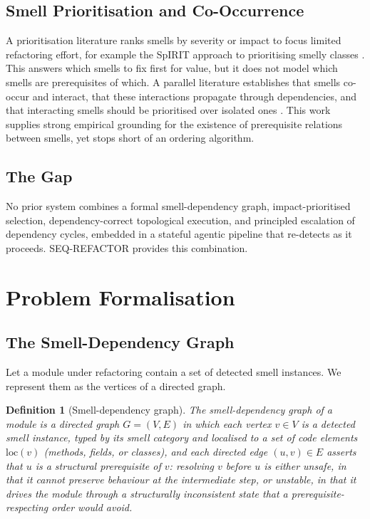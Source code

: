 \documentclass[journal,onecolumn,11pt]{IEEEtran}
\newtheorem{definition}{Definition}
\begin{document}
\subsection{Smell Prioritisation and Co-Occurrence}
A prioritisation literature ranks smells by severity or impact to focus limited refactoring effort, for example the SpIRIT approach to prioritising smelly classes \cite{vidal2016}. This answers which smells to fix first for value, but it does not model which smells are prerequisites of which. A parallel literature establishes that smells co-occur and interact, that these interactions propagate through dependencies, and that interacting smells should be prioritised over isolated ones \cite{yamashita2013,palomba2015}. This work supplies strong empirical grounding for the existence of prerequisite relations between smells, yet stops short of an ordering algorithm.

\subsection{The Gap}
No prior system combines a formal smell-dependency graph, impact-prioritised selection, dependency-correct topological execution, and principled escalation of dependency cycles, embedded in a stateful agentic pipeline that re-detects as it proceeds. SEQ-REFACTOR provides this combination.

\section{Problem Formalisation}
\label{sec:formal}
\subsection{The Smell-Dependency Graph}
Let a module under refactoring contain a set of detected smell instances. We represent them as the vertices of a directed graph.

\begin{definition}[Smell-dependency graph]
The smell-dependency graph of a module is a directed graph $G=(V,E)$ in which each vertex $v\in V$ is a detected smell instance, typed by its smell category and localised to a set of code elements $\mathrm{loc}(v)$ (methods, fields, or classes), and each directed edge $(u,v)\in E$ asserts that $u$ is a \emph{structural prerequisite} of $v$: resolving $v$ before $u$ is either unsafe, in that it cannot preserve behaviour at the intermediate step, or unstable, in that it drives the module through a structurally inconsistent state that a prerequisite-respecting order would avoid.
\end{definition}
\end{document}
